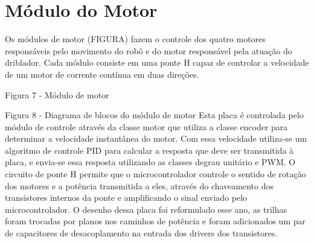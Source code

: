 \section{Módulo do Motor}\label{sec:modulo_motor}

Os módulos de motor (FIGURA) fazem o controle dos quatro motores responsáveis pelo movimento do robô e do motor responsável pela atuação do driblador. Cada módulo consiste em uma ponte H capaz de controlar a velocidade de um motor de corrente contínua em duas direções. 

Figura 7 - Módulo de motor

Figura 8 - Diagrama de blocos do módulo de motor
Esta placa é controlada pelo módulo de controle através da classe motor que utiliza a classe encoder para determinar a velocidade instantânea do motor. Com essa velocidade utiliza-se um algoritmo de controle PID para calcular a resposta que deve ser transmitida à placa, e envia-se essa resposta utilizando as classes degrau unitário e PWM.
O circuito de ponte H permite que o microcontrolador controle o sentido de rotação dos motores e a potência transmitida a eles, através do chaveamento dos transistores internos da ponte e amplificando o sinal enviado pelo microcontrolador.
O desenho dessa placa foi reformulado esse ano, as trilhas foram trocadas por planos nos caminhos de potência e foram adicionados um par de capacitores de desacoplamento na entrada dos drivers dos transistores.



